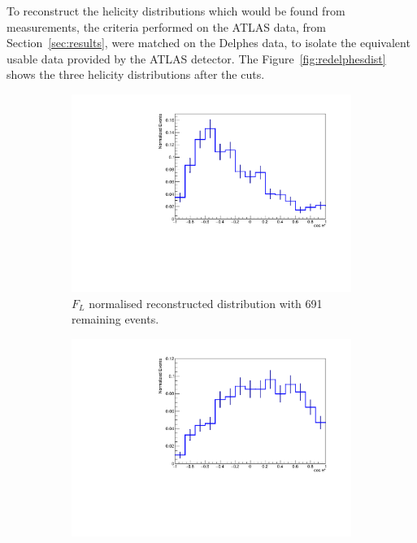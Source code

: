 \documentclass[12pt,a4paper]{article}
\numberwithin{equation}{section}
\begin{document}
To reconstruct the helicity distributions which would be found from
measurements, the criteria performed on the ATLAS data, from
Section~\ref{sec:results}, were matched on the Delphes data, to isolate the
equivalent usable data provided by the ATLAS detector. The
Figure~\ref{fig:redelphesdist} shows the three helicity distributions after the
cuts.
\begin{figure}[t!]
  \centering
  \begin{subfigure}[t]{0.47\textwidth}
    \centering
    \includegraphics[width=1.2\textwidth]{figures/delphes_ctstarL}
    \caption{$F_L$ normalised reconstructed distribution with 691 remaining events.}
  \end{subfigure}\hfill{}%
  \begin{subfigure}[t]{0.47\textwidth}
    \centering
    \includegraphics[width=1.2\textwidth]{figures/delphes_ctstarR}

\end{subfigure}
\end{figure}
\end{document}
